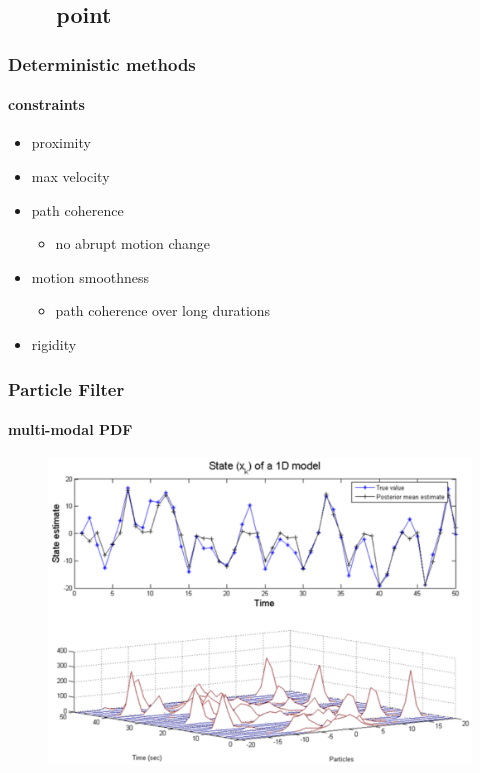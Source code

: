\subsection{\ \ \ \ point}
\begin{frame}
\frametitle{Deterministic methods}
\framesubtitle{constraints}
\logoCSIPCPL\mypagenum
	\begin{itemize}
		\item proximity
		\item max velocity
		\item path coherence
			\begin{itemize}
				\item no abrupt motion change
			\end{itemize}
		\item motion smoothness
			\begin{itemize}
				\item path coherence over long durations
			\end{itemize}			
		\item rigidity
	\end{itemize}
\end{frame}


\begin{frame}
\frametitle{Particle Filter}
\framesubtitle{multi-modal PDF}
\logoCSIPCPL\mypagenum
	\begin{figure}
		\includegraphics[width=1.0\textwidth]{figs/TRK_ParticleFilter_multimodalPDF.pdf}
	\end{figure}	
\end{frame}




